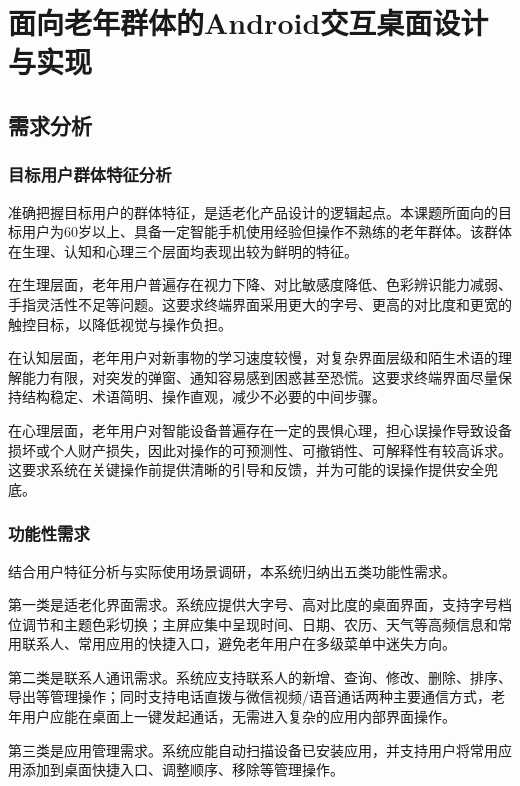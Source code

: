 \chapter{面向老年群体的Android交互桌面设计与实现}

\section{需求分析}

\subsection{目标用户群体特征分析}

准确把握目标用户的群体特征，是适老化产品设计的逻辑起点。本课题所面向的目标用户为60岁以上、具备一定智能手机使用经验但操作不熟练的老年群体。该群体在生理、认知和心理三个层面均表现出较为鲜明的特征。

在生理层面，老年用户普遍存在视力下降、对比敏感度降低、色彩辨识能力减弱、手指灵活性不足等问题。这要求终端界面采用更大的字号、更高的对比度和更宽的触控目标，以降低视觉与操作负担。

在认知层面，老年用户对新事物的学习速度较慢，对复杂界面层级和陌生术语的理解能力有限，对突发的弹窗、通知容易感到困惑甚至恐慌。这要求终端界面尽量保持结构稳定、术语简明、操作直观，减少不必要的中间步骤。

在心理层面，老年用户对智能设备普遍存在一定的畏惧心理，担心误操作导致设备损坏或个人财产损失，因此对操作的可预测性、可撤销性、可解释性有较高诉求。这要求系统在关键操作前提供清晰的引导和反馈，并为可能的误操作提供安全兜底。

\subsection{功能性需求}

结合用户特征分析与实际使用场景调研，本系统归纳出五类功能性需求。

第一类是适老化界面需求。系统应提供大字号、高对比度的桌面界面，支持字号档位调节和主题色彩切换；主屏应集中呈现时间、日期、农历、天气等高频信息和常用联系人、常用应用的快捷入口，避免老年用户在多级菜单中迷失方向。

第二类是联系人通讯需求。系统应支持联系人的新增、查询、修改、删除、排序、导出等管理操作；同时支持电话直拨与微信视频/语音通话两种主要通信方式，老年用户应能在桌面上一键发起通话，无需进入复杂的应用内部界面操作。

第三类是应用管理需求。系统应能自动扫描设备已安装应用，并支持用户将常用应用添加到桌面快捷入口、调整顺序、移除等管理操作。

